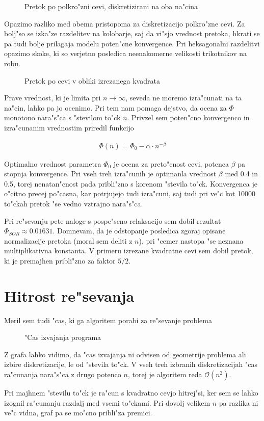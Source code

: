 \documentclass[a4paper,10pt]{article}
\begin{document}
\begin{figure}[H]
 
 \caption{Pretok po polkro"zni cevi, diskretizirani na oba na"cina}
 \label{fig:pretok-polkrog}
\end{figure}

Opazimo razliko med obema pristopoma za diskretizacijo polkro"zne cevi. Za bolj"so se izka"ze razdelitev na kolobarje, saj da vi"sjo vrednost pretoka, hkrati se pa tudi bolje prilagaja modelu poten"cne konvergence. Pri heksagonalni razdelitvi opazimo skoke, ki so verjetno posledica neenakomerne velikosti trikotnikov na robu. 

\begin{figure}[H]
 
 \caption{Pretok po cevi v obliki izrezanega kvadrata}
 \label{fig:pretok-kvadrat}
\end{figure}

Prave vrednost, ki je limita pri $n\to\infty$, seveda ne moremo izra"cunati na ta na"cin, lahko pa jo ocenimo. Pri tem nam pomaga dejstvo, da ocena za $\Phi$ monotono nara"s"ca s "stevilom to"ck $n$. Privzel sem poten"cno konvergenco in izra"cunanim vrednostim priredil funkcijo

\begin{align}
 \Phi(n) = \Phi_0 - \alpha \cdot n^{-\beta}
\end{align}

Optimalno vrednost parametra $\Phi_0$ je ocena za preto"cnost cevi, potenca $\beta$ pa stopnja konvergence. Pri vseh treh izra"cunih je optimanla vrednost $\beta$ med 0.4 in 0.5, torej nenatan"cnost pada pribli"zno s korenom "stevila to"ck. Konvergenca je o"citno precej po"casna, kar potrjujejo tudi izra"cuni, saj tudi pri ve"c kot 10000 to"ckah pretok "se vedno vztrajno nara"s"ca. 

Pri re"sevanju pete naloge s pospe"seno relaksacijo sem dobil rezultat $\Phi_{SOR} \approx 0.01631$. Domnevam, da je odstopanje posledica zgoraj opisane normalizacije pretoka (moral sem deliti z $n$), pri "cemer nastopa "se neznana multiplikativna konstanta. V primeru izrezane kvadratne cevi sem dobil pretok, ki je premajhen pribli"zno za faktor $5/2$. 

\section{Hitrost re"sevanja}

Meril sem tudi "cas, ki ga algoritem porabi za re"sevanje problema

\begin{figure}[H]
 
 \caption{"Cas izvajanja programa}
 \label{fig:hitrost}
\end{figure}

Z grafa lahko vidimo, da "cas izvajanja ni odvisen od geometrije problema ali izbire diskretizacije, le od "stevila to"ck. V vseh treh izbranih diskretizacijah "cas ra"cunanja nara"s"ca z drugo potenco $n$, torej je algoritem reda $\mathcal{O}(n^2)$.

Pri majhnem "stevilu to"ck je ra"cun s kvadratno cevjo hitrej"si, ker sem se lahko izognil ra"cunanju razdalj med vsemi to"ckami. Pri dovolj velikem $n$ pa razlika ni ve"c vidna, graf pa se mo"cno pribli"za premici. 
\end{document}
